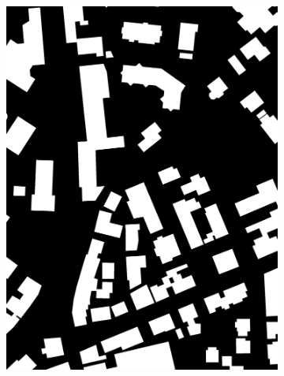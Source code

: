 \begin{figure}[htb]
\begin{subfigure}{0.19\textwidth}
  \includegraphics[width=1\linewidth]{fig/vai/1_osm.jpg}
\end{subfigure}
\begin{subfigure}{0.19\textwidth}
  \centering

\end{subfigure}
\end{figure}
